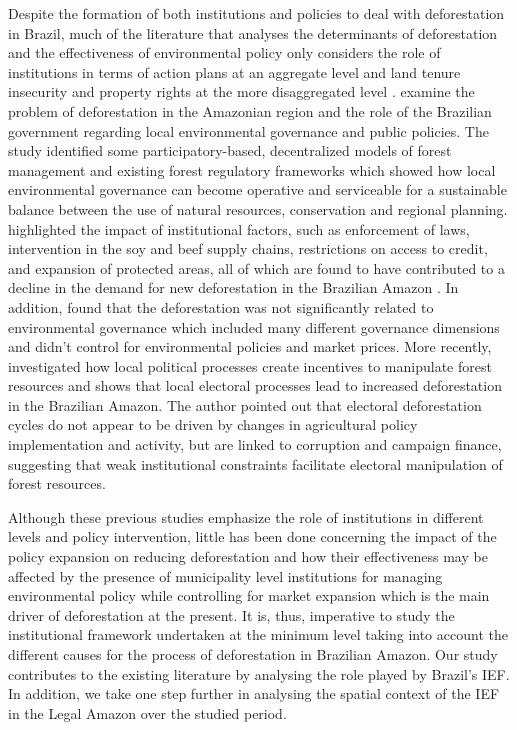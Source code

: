 Despite the formation of both institutions and policies to deal with deforestation in Brazil, much of the literature that analyses the determinants of deforestation and the effectiveness of environmental policy only considers the role of institutions in terms of action plans at an aggregate level and land tenure insecurity and property rights at the more disaggregated level \citep{ARAUJO, OLIVEIRA2}. \citet{BORGES} examine the problem of deforestation in the Amazonian region and the role of the Brazilian government regarding local environmental governance and public policies. The study identified some participatory-based, decentralized models of forest management and existing forest regulatory frameworks which showed how local environmental governance can become operative and serviceable for a sustainable balance between the use of natural resources, conservation and regional planning. \citet{NEPSTAD} highlighted the impact of institutional factors, such as enforcement of laws, intervention in the soy and beef supply chains, restrictions on access to credit, and expansion of protected areas, all of which are found to have contributed to a decline in the demand for new deforestation in the Brazilian Amazon \citep{NEPSTAD}. In addition, \citet{VALENTIM2} found that the deforestation was not significantly related to environmental governance which included many different governance dimensions and didn't control for environmental policies and market prices. More recently, \citet{pailler_2018} investigated how local political processes create incentives to manipulate forest resources and shows that local electoral processes lead to increased deforestation in the Brazilian Amazon. The author pointed out that electoral deforestation cycles do not appear to be driven by changes in agricultural policy implementation and activity, but are linked to corruption and campaign finance, suggesting that weak institutional constraints facilitate electoral manipulation of forest resources.

Although these previous studies emphasize the role of institutions in different levels and policy intervention, little has been done concerning the impact of the policy expansion on reducing deforestation and how their effectiveness may be affected by the presence of municipality level institutions for managing environmental policy while controlling for market expansion which is the main driver of deforestation at the present. It is, thus, imperative to study the institutional framework undertaken at the minimum level taking into account the different causes for the process of deforestation in Brazilian Amazon. Our study contributes to the existing literature by analysing the role played by Brazil's IEF. In addition, we take one step further in analysing the spatial context of the IEF in the Legal Amazon over the studied period.

